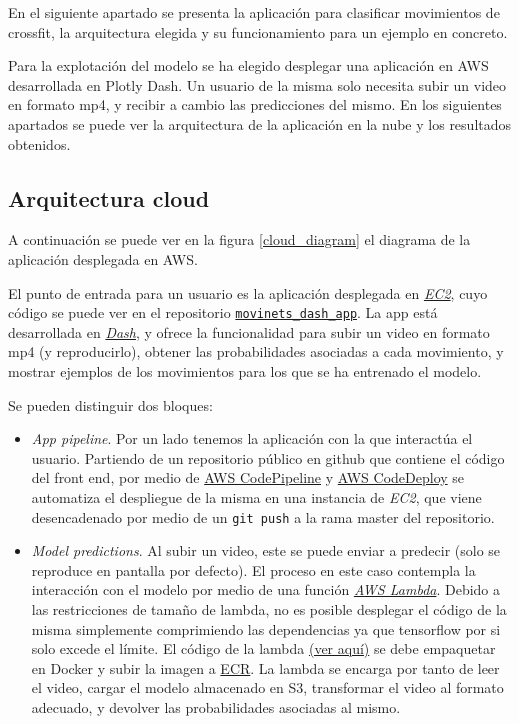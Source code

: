 En el siguiente apartado se presenta la aplicación para clasificar movimientos de crossfit, la arquitectura elegida y su funcionamiento para un ejemplo en concreto.

Para la explotación del modelo se ha elegido desplegar una aplicación en AWS desarrollada en Plotly Dash. Un usuario de la misma solo necesita subir un video en formato mp4, y recibir a cambio las predicciones del mismo. En los siguientes apartados se puede ver la arquitectura de la aplicación en la nube y los resultados obtenidos.

\subsection{Arquitectura cloud}

A continuación se puede ver en la figura \ref{cloud_diagram} el diagrama de la aplicación desplegada en AWS.

El punto de entrada para un usuario es la aplicación desplegada en \href{https://aws.amazon.com/es/ec2/}{\textit{EC2}}, cuyo código se puede ver en el repositorio \href{https://github.com/plaguss/movinets_dash_app}{\texttt{movinets\_dash\_app}}. La app está desarrollada en \href{https://plotly.com/dash/}{\textit{Dash}}, y ofrece la funcionalidad para subir un video en formato mp4 (y reproducirlo), obtener las probabilidades asociadas a cada movimiento, y mostrar ejemplos de los movimientos para los que se ha entrenado el modelo.

Se pueden distinguir dos bloques:
%
\begin{itemize}%
%
\item \textit{App pipeline}.
Por un lado tenemos la aplicación con la que interactúa el usuario.
Partiendo de un repositorio público en github que contiene el código del front end, por medio de \href{https://aws.amazon.com/es/codepipeline/}{AWS CodePipeline} y \href{https://aws.amazon.com/es/codedeploy/}{AWS CodeDeploy} se automatiza el despliegue de la misma en una instancia de \textit{EC2}, que viene desencadenado por medio de un \texttt{git push} a la rama master del repositorio.

\item \textit{Model predictions}.
Al subir un video, este se puede enviar a predecir (solo se reproduce en pantalla por defecto). El proceso en este caso contempla la interacción con el modelo por medio de una función \href{https://aws.amazon.com/es/lambda/}{\textit{AWS Lambda}}. Debido a las restricciones de tamaño de lambda, no es posible desplegar el código de la misma simplemente comprimiendo las dependencias ya que tensorflow por si solo excede el límite. El código de la lambda \href{https://github.com/plaguss/tfm-misc/tree/main/lambda_aws}{(ver aquí)} se debe empaquetar en Docker y subir la imagen a \href{https://aws.amazon.com/es/ecr/}{ECR}. La lambda se encarga por tanto de leer el video, cargar el modelo almacenado en S3, transformar el video al formato adecuado, y devolver las probabilidades asociadas al mismo.

\end{itemize}


